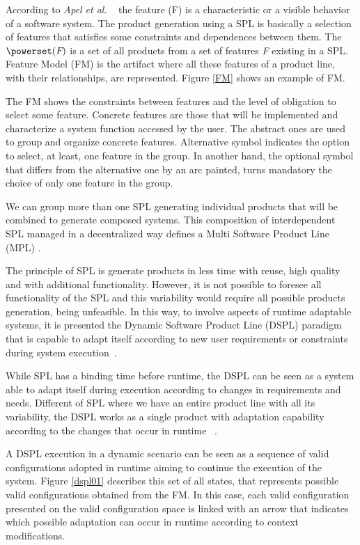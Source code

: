 According to \textit{Apel et al. }~\cite{Apel2013} the feature (F) is a characteristic or a visible behavior of a software system. The product generation using a SPL is basically a selection of features that satisfies some constraints and dependences between them. The $\powerset(\textit{F})$ is a set of all products from a set of features \textit{F} existing in a SPL. Feature Model (FM) is the artifact where all these features of a product line, with their relationships, are represented. Figure \ref{FM} shows an example of FM.

%

The FM shows the constraints between features and the level of obligation to select some feature. Concrete features are those that will be implemented and characterize a system function accessed by the user. The abstract ones are used to group and organize concrete features. Alternative symbol indicates the option to select, at least, one feature in the group. In another hand, the optional symbol that differs from the alternative one by an arc painted, turns mandatory the choice of only one feature in the group.

We can group more than one SPL generating individual products that will be combined to generate composed systems. This composition of interdependent SPL managed in a decentralized way defines a Multi Software Product Line (MPL) \cite{Lienhardt2018}.

The principle of SPL is generate products in less time with reuse, high quality and with additional functionality. However, it is not possible to foresee all functionality of the SPL and this variability would require all possible products generation, being unfeasible. In this way, to involve aspects of runtime adaptable systems, it is presented the Dynamic Software Product Line (DSPL) paradigm that is capable to adapt itself according to new user requirements or constraints during system execution~\cite{DSPL100-1}.

While SPL has a binding time before runtime, the DSPL can be seen as a system able to adapt itself during execution according to changes in requirements and needs. Different of SPL where we have an entire product line with all its variability, the DSPL works as a single product with adaptation capability according to the changes that occur in runtime ~\cite{Hinchey2012}.

A DSPL execution in a dynamic scenario can be seen as a sequence of valid configurations adopted in runtime aiming to continue the execution of the system. Figure \ref{dspl01} describes this set of all states, that represents possible valid configurations obtained from the FM.  In this case, each valid configuration presented on the valid configuration space is linked with an arrow that indicates which possible adaptation can occur in runtime according to context modifications. 

